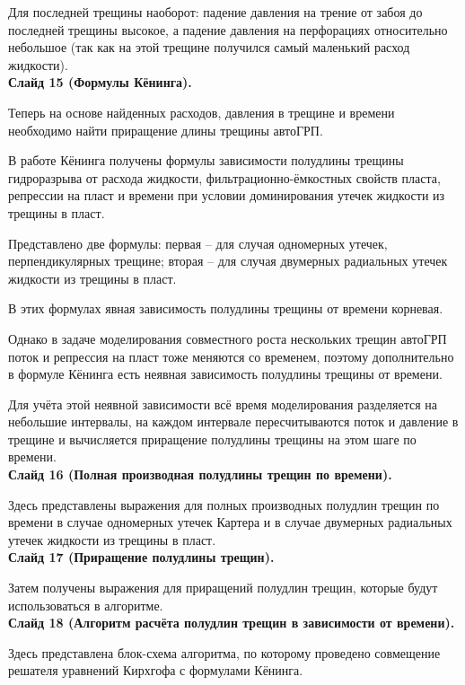 \documentclass[a4paper, 12pt]{article}
\begin{document}
Для последней трещины наоборот: падение давления на трение от забоя до последней трещины высокое, а падение давления на перфорациях относительно небольшое (так как на этой трещине получился самый маленький расход жидкости).
\\

\textbf{Слайд 15 (Формулы Кёнинга).}

Теперь на основе найденных расходов, давления в трещине и времени необходимо найти приращение длины трещины автоГРП.

В работе Кёнинга получены формулы зависимости полудлины трещины гидроразрыва от расхода жидкости, фильтрационно-ёмкостных свойств пласта, репрессии на пласт и времени при условии доминирования утечек жидкости из трещины в пласт.

Представлено две формулы: первая -- для случая одномерных утечек, перпендикулярных трещине; вторая -- для случая двумерных радиальных утечек жидкости из трещины в пласт.

В этих формулах явная зависимость полудлины трещины от времени корневая.

Однако в задаче моделирования совместного роста нескольких трещин автоГРП поток и репрессия на пласт тоже меняются со временем, поэтому дополнительно в формуле Кёнинга есть неявная зависимость полудлины трещины от времени.

Для учёта этой неявной зависимости всё время моделирования разделяется на небольшие интервалы, на каждом интервале пересчитываются поток и давление в трещине и вычисляется приращение полудлины трещины на этом шаге по времени.
\\

\textbf{Слайд 16 (Полная производная полудлины трещин по времени).}

Здесь представлены выражения для полных производных полудлин трещин по времени в случае одномерных утечек Картера и в случае двумерных радиальных утечек жидкости из трещины в пласт.
\\

\textbf{Слайд 17 (Приращение полудлины трещин).}

Затем получены выражения для приращений полудлин трещин, которые будут использоваться в алгоритме.
\\

\textbf{Слайд 18 (Алгоритм расчёта полудлин трещин в зависимости от времени).}

Здесь представлена блок-схема алгоритма, по которому проведено совмещение решателя уравнений Кирхгофа с формулами Кёнинга.
\end{document}
